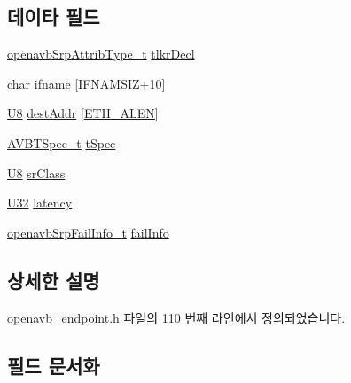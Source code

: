 \subsection*{데이타 필드}
\begin{DoxyCompactItemize}
\item 
\hyperlink{openavb__srp__api_8h_a7ce5dfba4778303642ed038768d95bd2}{openavb\+Srp\+Attrib\+Type\+\_\+t} \hyperlink{structopenavb_endpoint_params___listener_callback__t_a92e57eccdd4620b8f5038f2c0d78537d}{tlkr\+Decl}
\item 
char \hyperlink{structopenavb_endpoint_params___listener_callback__t_a11d6071e5fa37b0c5776e17651485f11}{ifname} \mbox{[}\hyperlink{tl_2openavb__tl__pub_8h_acd06da230a96d3b7e6f193c5b3142002}{I\+F\+N\+A\+M\+S\+IZ}+10\mbox{]}
\item 
\hyperlink{openavb__types__base__pub_8h_aa63ef7b996d5487ce35a5a66601f3e73}{U8} \hyperlink{structopenavb_endpoint_params___listener_callback__t_a016f2167ae2143dcacd762c10be2f614}{dest\+Addr} \mbox{[}\hyperlink{avb__avtp_8h_a9822d89774e0d6ddaa06503950130423}{E\+T\+H\+\_\+\+A\+L\+EN}\mbox{]}
\item 
\hyperlink{struct_a_v_b_t_spec__t}{A\+V\+B\+T\+Spec\+\_\+t} \hyperlink{structopenavb_endpoint_params___listener_callback__t_ab928eca0e7b010a8cc3a80be5bc8adcc}{t\+Spec}
\item 
\hyperlink{openavb__types__base__pub_8h_aa63ef7b996d5487ce35a5a66601f3e73}{U8} \hyperlink{structopenavb_endpoint_params___listener_callback__t_a0ce524f0210a76139ed0aa1ae3ff24f4}{sr\+Class}
\item 
\hyperlink{openavb__types__base__pub_8h_a696390429f2f3b644bde8d0322a24124}{U32} \hyperlink{structopenavb_endpoint_params___listener_callback__t_ae16309c230017ae952e8a54441556efc}{latency}
\item 
\hyperlink{openavb__srp__api_8h_a09c6c517b461f3367ff591f42916d957}{openavb\+Srp\+Fail\+Info\+\_\+t} \hyperlink{structopenavb_endpoint_params___listener_callback__t_ababc5c648c7af6384d778794cf8a1780}{fail\+Info}
\end{DoxyCompactItemize}


\subsection{상세한 설명}


openavb\+\_\+endpoint.\+h 파일의 110 번째 라인에서 정의되었습니다.



\subsection{필드 문서화}
